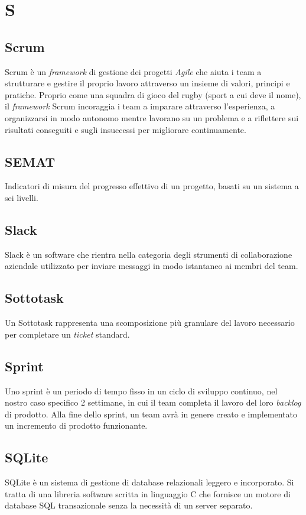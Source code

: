 \chapter{S}

\section{Scrum}
Scrum è un \emph{framework} di gestione dei progetti \emph{Agile} che aiuta i team a strutturare e gestire il proprio lavoro attraverso un insieme di valori, principi e pratiche. Proprio come una squadra di gioco del rugby (sport a cui deve il nome), il \emph{framework} Scrum incoraggia i team a imparare attraverso l'esperienza, a organizzarsi in modo autonomo mentre lavorano su un problema e a riflettere sui risultati conseguiti e sugli insuccessi per migliorare continuamente.

\section{SEMAT}
Indicatori di misura del progresso effettivo di un progetto, basati su un sistema a sei livelli.

\section{Slack}
Slack è un software che rientra nella categoria degli strumenti di collaborazione aziendale utilizzato per inviare messaggi in modo istantaneo ai membri del team.

\section{Sottotask}
Un Sottotask rappresenta una scomposizione più granulare del lavoro necessario per completare un \emph{ticket} standard.

\section{Sprint}
Uno sprint è un periodo di tempo fisso in un ciclo di sviluppo continuo, nel nostro caso specifico 2 settimane, in cui il team completa il lavoro del loro \emph{backlog} di prodotto. Alla fine dello sprint, un team avrà in genere creato e implementato un incremento di prodotto funzionante.

\section{SQLite}\label{sec:SQLite3}
SQLite è un sistema di gestione di database relazionali leggero e incorporato. Si tratta di una libreria software scritta in linguaggio C che fornisce un motore di database SQL transazionale senza la necessità di un server separato.

